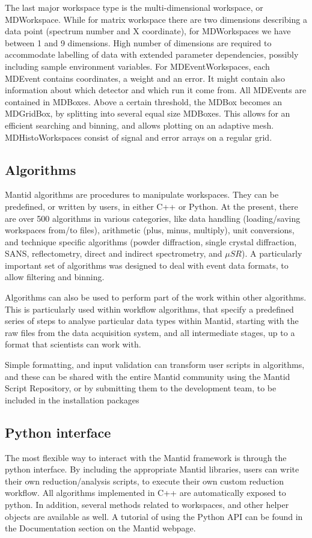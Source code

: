 \documentclass{elsarticle}
\begin{document}
The last major workspace type is the multi-dimensional workspace, or MDWorkspace. While for matrix workspace there are two dimensions describing a data point (spectrum number and X coordinate), for MDWorkspaces we have between 1 and 9 dimensions. High number of dimensions are required to accommodate labelling of data with extended parameter dependencies, possibly including sample environment variables. For MDEventWorkspaces, each MDEvent contains coordinates, a weight and an error. It might contain also information about which detector and which run it come from. All MDEvents are contained in MDBoxes. Above a certain threshold, the MDBox becomes an MDGridBox, by splitting into several equal size MDBoxes. This allows for an efficient searching and binning, and allows plotting on an adaptive mesh. MDHistoWorkspaces consist of signal and error arrays on a regular grid.  

\subsection{Algorithms}
Mantid algorithms are procedures to manipulate workspaces. They can be predefined, or written by users, in either C++ or Python. At the present, there are over 500 algorithms in various categories, like data handling (loading/saving workspaces from/to files), arithmetic (plus, minus, multiply), unit conversions, and technique specific algorithms (powder diffraction, single crystal diffraction, SANS, reflectometry, direct and indirect spectrometry, and $\mu SR$). A particularly important set of algorithms was designed to deal with event data formats, to allow filtering and binning.

Algorithms can also be used to perform part of the work within other algorithms. This is particularly used within workflow algorithms, that specify a predefined series of steps to analyse particular data types within Mantid, starting with the raw files from the data acquisition system, and all intermediate stages, up to a format that scientists can work with.

Simple formatting, and input validation can transform user scripts in algorithms, and these can be shared with the entire Mantid community using the Mantid Script Repository, or by submitting them to the development team, to be included in the installation packages


\subsection{Python interface}
The most flexible way to interact with the Mantid framework is through the python interface. By including the appropriate Mantid libraries, users can write their own reduction/analysis scripts, to execute their own custom reduction workflow. All algorithms implemented in C++ are automatically exposed to python. In addition, several methods related to workspaces, and other helper objects are available as well. A tutorial of using the Python API can be found in the Documentation section on the Mantid webpage\cite{webpage}.  
\end{document}
